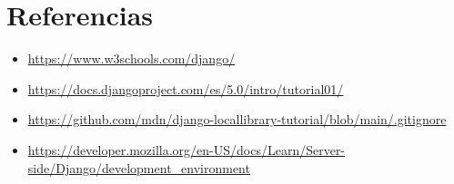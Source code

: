 \documentclass{article}
\begin{document}
\clearpage

\section{Referencias}
\begin{itemize}			
        \item \url{https://www.w3schools.com/django/}
        \item \url{https://docs.djangoproject.com/es/5.0/intro/tutorial01/}
        \item \url{https://github.com/mdn/django-locallibrary-tutorial/blob/main/.gitignore}
        \item \url{https://developer.mozilla.org/en-US/docs/Learn/Server-side/Django/development_environment}
\end{itemize}	
	
%
%
%
			
\end{document}
